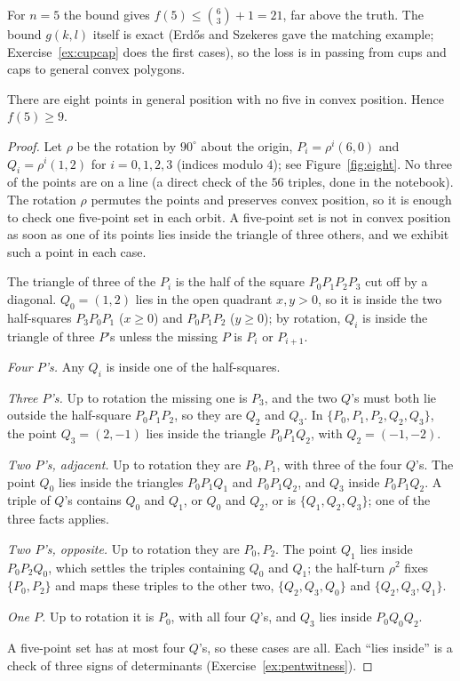 For $n=5$ the bound gives $f(5)\le\binom63+1=21$, far above the truth. The bound $g(k,l)$ itself is exact (Erd\H os and Szekeres gave the matching
example; Exercise~\ref{ex:cupcap} does the first cases), so the loss is in passing from cups and caps to general convex polygons.

\begin{proposition}\label{prop:eight}
There are eight points in general position with no five in convex position. Hence $f(5)\ge9$.
\end{proposition}
\begin{proof}
Let $\rho$ be the rotation by $90^\circ$ about the origin, $P_i=\rho^i(6,0)$ and $Q_i=\rho^i(1,2)$ for $i=0,1,2,3$ (indices modulo $4$); see
Figure~\ref{fig:eight}. No three of the points are on a line (a direct check of the $56$ triples, done in the notebook). The rotation $\rho$ permutes
the points and preserves convex position, so it is enough to check one five-point set in each orbit. A five-point set is not in convex position as
soon as one of its points lies inside the triangle of three others, and we exhibit such a point in each case.

The triangle of three of the $P_i$ is the half of the square $P_0P_1P_2P_3$ cut off by a diagonal. $Q_0=(1,2)$ lies in the open quadrant $x,y>0$, so it is
inside the two half-squares $P_3P_0P_1$ ($x\ge0$) and $P_0P_1P_2$ ($y\ge0$); by rotation, $Q_i$ is inside the triangle of three $P$'s unless the
missing $P$ is $P_i$ or $P_{i+1}$.

\emph{Four $P$'s.} Any $Q_i$ is inside one of the half-squares.

\emph{Three $P$'s.} Up to rotation the missing one is $P_3$, and the two $Q$'s must both lie outside the half-square $P_0P_1P_2$, so they are $Q_2$ and
$Q_3$. In $\{P_0,P_1,P_2,Q_2,Q_3\}$, the point $Q_3=(2,-1)$ lies inside the triangle $P_0P_1Q_2$, with $Q_2=(-1,-2)$.

\emph{Two $P$'s, adjacent.} Up to rotation they are $P_0,P_1$, with three of the four $Q$'s. The point $Q_0$ lies inside the triangles $P_0P_1Q_1$ and
$P_0P_1Q_2$, and $Q_3$ inside $P_0P_1Q_2$. A triple of $Q$'s contains $Q_0$ and $Q_1$, or $Q_0$ and $Q_2$, or is $\{Q_1,Q_2,Q_3\}$; one of the three facts
applies.

\emph{Two $P$'s, opposite.} Up to rotation they are $P_0,P_2$. The point $Q_1$ lies inside $P_0P_2Q_0$, which settles the triples containing $Q_0$ and $Q_1$;
the half-turn $\rho^2$ fixes $\{P_0,P_2\}$ and maps these triples to the other two, $\{Q_2,Q_3,Q_0\}$ and $\{Q_2,Q_3,Q_1\}$.

\emph{One $P$.} Up to rotation it is $P_0$, with all four $Q$'s, and $Q_3$ lies inside $P_0Q_0Q_2$.

A five-point set has at most four $Q$'s, so these cases are all. Each ``lies inside'' is a check of three signs of determinants
(Exercise~\ref{ex:pentwitness}).
\end{proof}

